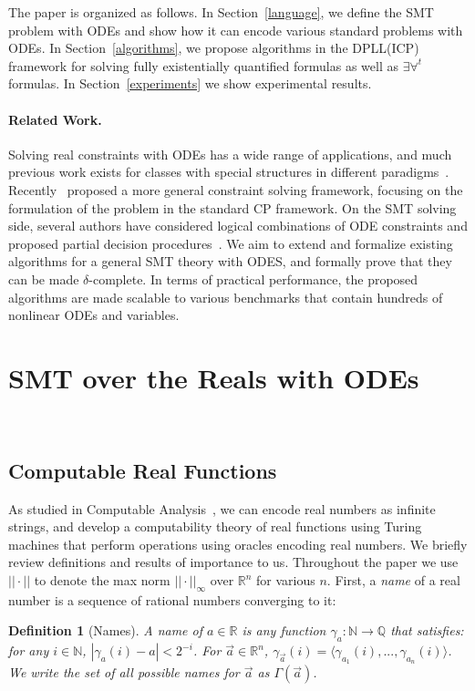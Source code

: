 \documentclass[12pt]{article}
\newtheorem{definition}[theorem]{Definition}
\begin{document}
The paper is organized as follows. In Section~\ref{language}, we define the SMT problem with ODEs and show how it can encode various standard problems with ODEs. In Section~\ref{algorithms}, we propose algorithms in the DPLL(ICP) framework for solving fully existentially quantified formulas as well as $\exists\forall^t$ formulas. In Section~\ref{experiments} we show experimental results.

\paragraph{Related Work.} 
Solving real constraints with ODEs has a wide range of applications, and much previous work exists for classes with special structures in different paradigms~\cite{DBLP:conf/cp/CruzB03,Granvilliers:2005:PEU:1039891.1039931,Lin07guaranteedstate}. Recently~\cite{DBLP:conf/cp/GoldsztejnMEH10} proposed a more general constraint solving framework, focusing on the formulation of the problem in the standard CP framework. On the SMT solving side, several authors have considered logical combinations of ODE constraints and proposed partial decision procedures~\cite{Eggers2008,Eggers2011,DBLP:journals/sttt/IshiiUH11}. We aim to extend and formalize existing algorithms for a general SMT theory with ODES, and formally prove that they can be made $\delta$-complete. In terms of practical performance, the proposed algorithms are made scalable to various benchmarks that contain hundreds of nonlinear ODEs and variables. 

\section{SMT over the Reals with ODEs}~\label{language}
\vspace{-0.8cm}
\subsection{Computable Real Functions}
As studied in Computable Analysis~\cite{CAbook,Kobook}, we can encode real numbers as infinite strings, and develop a computability theory of real functions using Turing machines that perform operations using oracles encoding real numbers.  We briefly review definitions and results of importance to us. Throughout the paper we use $||\cdot||$ to denote the max norm $||\cdot||_{\infty}$ over $\mathbb{R}^n$ for various $n$. First, a {\em name} of a real number is a sequence of rational numbers converging to it:
\begin{definition}[Names]
A name of $a\in \mathbb{R}$ is any function $\mathcal{\gamma}_a: \mathbb{N}\rightarrow \mathbb{Q}$ that satisfies:  for any $i\in \mathbb{N}$, $|\gamma_a(i) - a|<2^{-i}$. For $\vec a\in \mathbb{R}^n$, $\gamma_{\vec a}(i) = \langle \gamma_{a_1}(i), ..., \gamma_{a_n}(i)\rangle$. We write the set of all possible names for $\vec a$ as $\Gamma(\vec a)$.
\end{definition}
\end{document}
